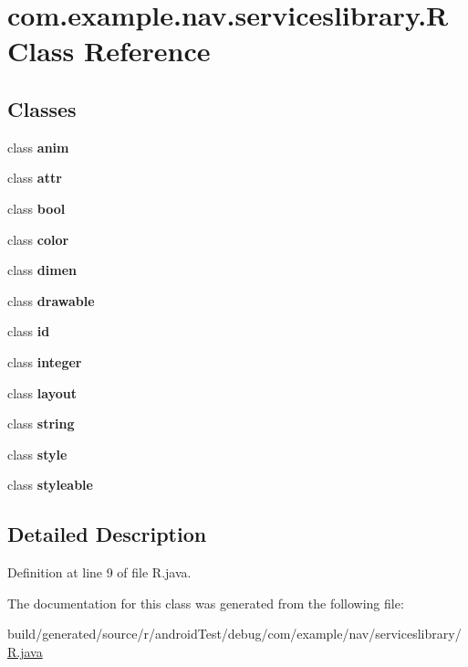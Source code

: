 \hypertarget{classcom_1_1example_1_1nav_1_1serviceslibrary_1_1_r}{}\section{com.\+example.\+nav.\+serviceslibrary.\+R Class Reference}
\label{classcom_1_1example_1_1nav_1_1serviceslibrary_1_1_r}
\subsection*{Classes}
\begin{DoxyCompactItemize}
\item 
class {\bfseries anim}
\item 
class {\bfseries attr}
\item 
class {\bfseries bool}
\item 
class {\bfseries color}
\item 
class {\bfseries dimen}
\item 
class {\bfseries drawable}
\item 
class {\bfseries id}
\item 
class {\bfseries integer}
\item 
class {\bfseries layout}
\item 
class {\bfseries string}
\item 
class {\bfseries style}
\item 
class {\bfseries styleable}
\end{DoxyCompactItemize}


\subsection{Detailed Description}


Definition at line 9 of file R.\+java.



The documentation for this class was generated from the following file\+:\begin{DoxyCompactItemize}
\item 
build/generated/source/r/android\+Test/debug/com/example/nav/serviceslibrary/\hyperlink{android_test_2debug_2com_2example_2nav_2serviceslibrary_2_r_8java}{R.\+java}\end{DoxyCompactItemize}
